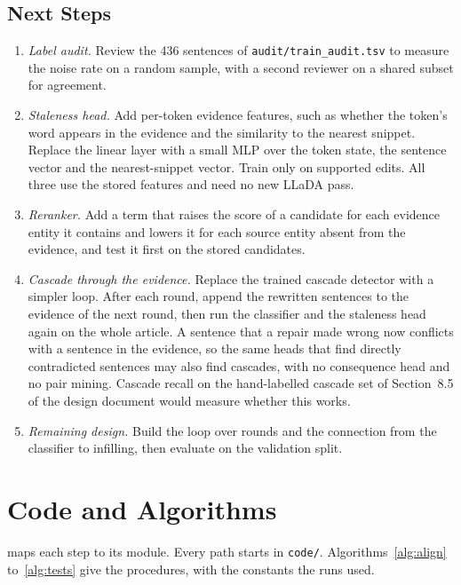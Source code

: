 \documentclass[]{paper}
\begin{document}
\subsection{Next Steps}

\begin{enumerate}
\item \emph{Label audit.} Review the 436 sentences of \texttt{audit/train\_audit.tsv} to measure the noise rate on a random sample, with a second reviewer on a shared subset for agreement.
\item \emph{Staleness head.} Add per-token evidence features, such as whether the token's word appears in the evidence and the similarity to the nearest snippet. Replace the linear layer with a small MLP over the token state, the sentence vector and the nearest-snippet vector. Train only on supported edits. All three use the stored features and need no new LLaDA pass.
\item \emph{Reranker.} Add a term that raises the score of a candidate for each evidence entity it contains and lowers it for each source entity absent from the evidence, and test it first on the stored candidates.
\item \emph{Cascade through the evidence.} Replace the trained cascade detector with a simpler loop. After each round, append the rewritten sentences to the evidence of the next round, then run the classifier and the staleness head again on the whole article. A sentence that a repair made wrong now conflicts with a sentence in the evidence, so the same heads that find directly contradicted sentences may also find cascades, with no consequence head and no pair mining. Cascade recall on the hand-labelled cascade set of Section~8.5 of the design document would measure whether this works.
\item \emph{Remaining design.} Build the loop over rounds and the connection from the classifier to infilling, then evaluate on the validation split.
\end{enumerate}

\clearpage



\clearpage
\setlength{\intextsep}{8pt plus 2pt minus 2pt}
\beginappendix{}

\section{Code and Algorithms}
\label{app:code}

 maps each step to its module. Every path starts in \texttt{code/}. Algorithms~\ref{alg:align} to~\ref{alg:tests} give the procedures, with the constants the runs used.
\end{document}

